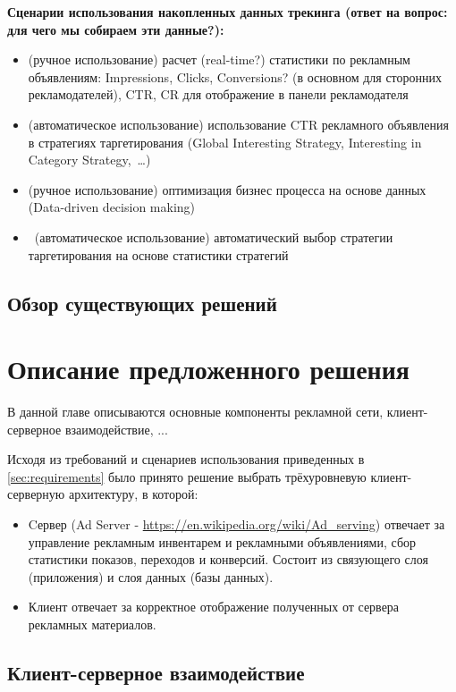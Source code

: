 \documentclass[times]{itmo-student-thesis}
\begin{document}
\textbf{Сценарии использования накопленных данных трекинга (ответ на вопрос: для чего мы собираем эти данные?):}
\begin{itemize}
	\item (ручное использование) расчет (real-time?) статистики по рекламным объявлениям: Impressions, Clicks, Conversions? (в основном для сторонних рекламодателей), CTR, CR для отображение в панели рекламодателя
	\item (автоматическое использование) использование CTR рекламного объявления в стратегиях таргетирования (Global Interesting Strategy, Interesting in Category Strategy, …)
	\item (ручное использование) оптимизация бизнес процесса на основе данных (Data-driven decision making)
	\item  (автоматическое использование) автоматический выбор стратегии таргетирования на основе статистики стратегий
\end{itemize}


\section{Обзор существующих решений}

\finishrelatedwork %


\chapterconclusion


\chapter{Описание предложенного решения}

В данной главе описываются основные компоненты рекламной сети, клиент-серверное взаимодействие, ...

Исходя из требований и сценариев использования приведенных в \ref{sec:requirements} было принято решение выбрать трёхуровневую клиент-серверную архитектуру, в которой:
\begin{itemize}
	\item Cервер (Ad Server - \url{https://en.wikipedia.org/wiki/Ad_serving}) отвечает за управление рекламным инвентарем и рекламными объявлениями, сбор статистики показов, переходов и конверсий. Состоит из связующего слоя (приложения) и слоя данных (базы данных).
	\item Клиент отвечает за корректное отображение полученных от сервера рекламных материалов.
\end{itemize}

\section{Клиент-серверное взаимодействие}
\end{document}
